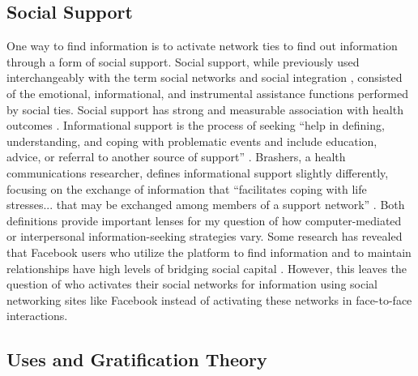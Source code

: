 \subsection{Social Support}

One way to find information is to activate network ties to find out information
through a form of social support. Social support, while previously used
interchangeably with the term social networks and social integration
\citep{houseStructuresProcessesSocial1988}, consisted of the emotional,
informational, and instrumental assistance functions performed by social ties.
Social support has strong and measurable association with health outcomes
\citep{houseMeasuresConceptsSocial1985, thoitsMechanismsLinkingSocial2011}.
Informational support is the process of seeking ``help in defining,
understanding, and coping with problematic events and include education, advice,
or referral to another source of support'' \citep[p. 640]{winemiller_etal93}.
Brashers, a health communications researcher, defines informational support
slightly differently, focusing on the exchange of information that ``facilitates
coping with life stresses... that may be exchanged among members of a support
network'' \citeyearpar[p. 260]{brashersInformationSeekingAvoiding2002}. Both
definitions provide important lenses for my question of how computer-mediated or
interpersonal information-seeking strategies vary. Some research has revealed
that Facebook users who utilize the platform to find information and to maintain
relationships have high levels of bridging social capital \citep{liu2016meta}.
However, this leaves the question of who activates their social networks for
information using social networking sites like Facebook instead of activating
these networks in face-to-face interactions.


\subsection{Uses and Gratification Theory}

